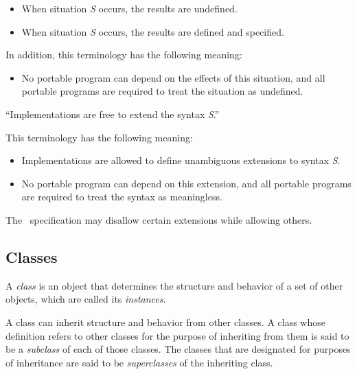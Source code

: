 \begin{flushdesc}
\begin{itemize}
\item  When situation \emph{S} occurs, the results are undefined.

\item  When situation \emph{S} occurs, the results are defined and
specified.

\end{itemize}


\noindent
In addition, this terminology has the following meaning:

\begin{itemize}

\item  No portable program can depend on the effects of this
situation, and all portable programs are required to treat the situation
as undefined.

\end{itemize}


\item[``Implementations are free to extend the syntax \emph{S}.'']

This terminology has the following meaning:

\begin{itemize}

\item  Implementations are allowed to define unambiguous extensions
to syntax \emph{S}.

\item  No portable program can depend on this extension, and
all portable programs are required to treat the syntax
as meaningless.

\end{itemize}
\end{flushdesc}

The \CLOS\ specification may disallow certain extensions while allowing others.

\subsection{Classes}
\label{Classes-SECTION}

A \emph{class} is an object that determines the structure and behavior 
of a set of other objects, which are called its \emph{instances}.

A class can inherit structure and behavior from other classes.  
A class whose definition refers to other classes for the purpose of
inheriting from them is said to be a \emph{subclass} of each of
those classes.  The classes that are designated for purposes of
inheritance are said to be \emph{superclasses}
of the inheriting class.

